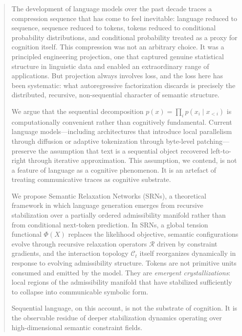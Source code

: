 \documentclass[11pt, a4paper]{article}
\theoremstyle{srn}
\theoremstyle{srnremark}
\newcommand{\Cstruct}{\mathcal{C}}           %
\newcommand{\Rop}{\mathcal{R}}           %
\newcommand{\Phiten}{\varPhi}            %
\begin{document}
\begin{abstract}
\noindent
The development of language models over the past decade traces a
compression sequence that has come to feel inevitable: language reduced
to sequence, sequence reduced to tokens, tokens reduced to conditional
probability distributions, and conditional probability treated as a
proxy for cognition itself.
This compression was not an arbitrary choice.
It was a principled engineering projection, one that captured genuine
statistical structure in linguistic data and enabled an extraordinary
range of applications.
But projection always involves loss, and the loss here has been
systematic: what autoregressive factorization discards is precisely
the distributed, recursive, non-sequential character of semantic
structure.

We argue that the sequential decomposition
$p(x) = \prod_i p(x_i \mid x_{<i})$
is computationally convenient rather than cognitively fundamental.
Current language models---including architectures that introduce local
parallelism through diffusion or adaptive tokenization through
byte-level patching---preserve the assumption that text is a
sequential object recovered left-to-right through iterative
approximation.
This assumption, we contend, is not a feature of language as a
cognitive phenomenon.
It is an artefact of treating communicative traces as cognitive
substrate.

We propose Semantic Relaxation Networks (SRNs), a theoretical framework
in which language generation emerges from recursive stabilization over
a partially ordered admissibility manifold rather than from conditional
next-token prediction.
In SRNs, a global tension functional $\Phiten(X)$ replaces the
likelihood objective, semantic configurations evolve through recursive
relaxation operators $\Rop$ driven by constraint gradients, and the
interaction topology $\Cstruct_t$ itself reorganizes dynamically in response
to evolving admissibility structure.
Tokens are not primitive units consumed and emitted by the model.
They are \emph{emergent crystallizations}: local regions of the
admissibility manifold that have stabilized sufficiently to collapse
into communicable symbolic form.

Sequential language, on this account, is not the substrate of
cognition.
It is the observable residue of deeper stabilization dynamics
operating over high-dimensional semantic constraint fields.
\end{abstract}
\end{document}
